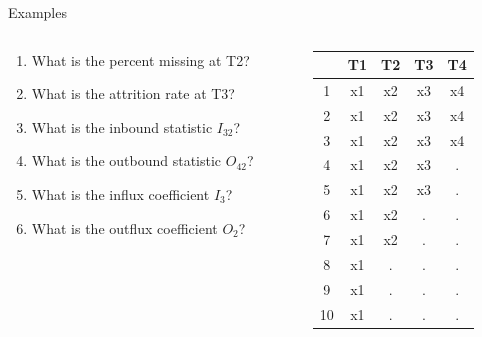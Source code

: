 \documentclass{beamer}\usepackage[]{graphicx}\usepackage[]{color}
\begin{document}
\begin{frame}{Examples}

  \begin{columns}
    \begin{column}{0.6\textwidth}

      \begin{enumerate}
        \item What is the percent missing at T2?
          \vb
        \item What is the attrition rate at T3?
          \vb
        \item What is the inbound statistic $I_{32}$?
          \vb
        \item What is the outbound statistic $O_{42}$?
          \vb
        \item What is the influx coefficient $I_3$?
          \vb
        \item What is the outflux coefficient $O_2$?
      \end{enumerate}

    \end{column}
    \begin{column}{0.4\textwidth}

\begin{table}[ht]
\centering
\begin{tabular}{ccccc}
  \toprule
 & T1 & T2 & T3 & T4 \\ 
  \midrule
1 & x1 & x2 & x3 & x4 \\ 
  2 & x1 & x2 & x3 & x4 \\ 
  3 & x1 & x2 & x3 & x4 \\ 
  4 & x1 & x2 & x3 & . \\ 
  5 & x1 & x2 & x3 & . \\ 
  6 & x1 & x2 & . & . \\ 
  7 & x1 & x2 & . & . \\ 
  8 & x1 & . & . & . \\ 
  9 & x1 & . & . & . \\ 
  10 & x1 & . & . & . \\ 
   \bottomrule
\end{tabular}
\end{table}


\end{column}
\end{columns}

\end{frame}
\end{document}
